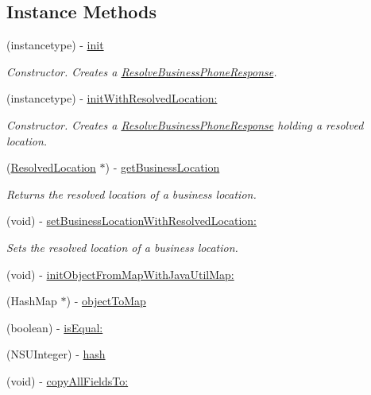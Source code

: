 \subsection*{Instance Methods}
\begin{DoxyCompactItemize}
\item 
(instancetype) -\/ \hyperlink{interface_resolve_business_phone_response_afc326fb468f498432d2ad1f1b05e3164}{init}
\begin{DoxyCompactList}\small\item\em Constructor. Creates a \hyperlink{interface_resolve_business_phone_response}{Resolve\+Business\+Phone\+Response}. \end{DoxyCompactList}\item 
(instancetype) -\/ \hyperlink{interface_resolve_business_phone_response_afcc262b45d41c55988915cbb5e3711b0}{init\+With\+Resolved\+Location\+:}
\begin{DoxyCompactList}\small\item\em Constructor. Creates a \hyperlink{interface_resolve_business_phone_response}{Resolve\+Business\+Phone\+Response} holding a resolved location. \end{DoxyCompactList}\item 
(\hyperlink{interface_resolved_location}{Resolved\+Location} $\ast$) -\/ \hyperlink{interface_resolve_business_phone_response_ad11433dce2adf92b6ea7d24d079c2b56}{get\+Business\+Location}
\begin{DoxyCompactList}\small\item\em Returns the resolved location of a business location. \end{DoxyCompactList}\item 
(void) -\/ \hyperlink{interface_resolve_business_phone_response_ab5288b62d2a46193e1316807a36a4e44}{set\+Business\+Location\+With\+Resolved\+Location\+:}
\begin{DoxyCompactList}\small\item\em Sets the resolved location of a business location. \end{DoxyCompactList}\item 
(void) -\/ \hyperlink{interface_resolve_business_phone_response_a8a5f1f0b9857edee6a1b56ec1da11449}{init\+Object\+From\+Map\+With\+Java\+Util\+Map\+:}
\item 
(Hash\+Map $\ast$) -\/ \hyperlink{interface_resolve_business_phone_response_a1b3f537d2c71d75935e138a945257939}{object\+To\+Map}
\item 
(boolean) -\/ \hyperlink{interface_resolve_business_phone_response_ad45b2e0de51c731ad63d6d13c8795b49}{is\+Equal\+:}
\item 
(N\+S\+U\+Integer) -\/ \hyperlink{interface_resolve_business_phone_response_a561feb366fa57cee7d2533fe60a5e189}{hash}
\item 
(void) -\/ \hyperlink{interface_resolve_business_phone_response_afede9dcad205900537bd1e004f334387}{copy\+All\+Fields\+To\+:}
\end{DoxyCompactItemize}

